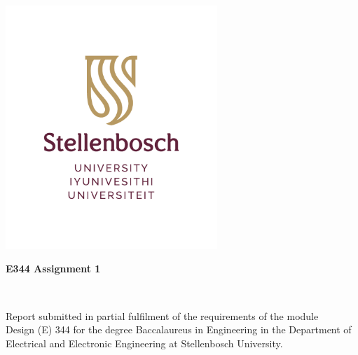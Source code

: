 \graphicspath{{frontmatter/fig/}}

\begin{titlepage}
\begin{center}

\includegraphics[width=8cm]{frontmatter/fig/SU_logo_RGB_without_slogan.pdf}

\vfill

{\sffamily \bfseries \huge E344 Assignment 1 \par}

\vfill

{\large {\Large \nameFull} \\ \stNumber \par}

\vfill

\vfill

{Report submitted in partial fulfilment of the requirements of the module \\
Design (E) 344 for the degree Baccalaureus in Engineering in the Department of
Electrical and Electronic Engineering at Stellenbosch University. \par}

\vfill


\vfill

{\Large \myDate}
\end{center}
\end{titlepage}
